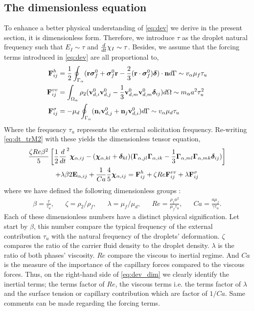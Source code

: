 \subsection{The dimensionless equation }


To enhance a better physical understanding of \ref{eq:dev} we derive in the present section, it is dimensionless form. 
Therefore, we introduce $\tau$ as the droplet natural frequency such that $E_I\sim \tau$ and $\frac{d}{dt} \chi_I \sim \tau$. 
Besides, we assume that the forcing terms introduced in \ref{eq:dev} are all proportional to, 
\begin{align*}
    \textbf{F}_{ij}^h
    &= \frac{1}{2}\oint_{\Gamma_{\alpha}} (\textbf{r}\bm\sigma_f^0 + \bm\sigma_f^0\textbf{r} - \frac{2}{3}(\textbf{r}\cdot \bm\sigma_f^0) \bm\delta)\cdot \textbf{n} d\Gamma 
    \sim v_\alpha \mu_f\tau_u \\
    \textbf{F}_{ij}^{vv}
    &= \int_{\Omega_{\alpha}} \rho_2 (\textbf{v}_{d,i}^0\textbf{v}_{d,j}^0 - \frac{1}{3}\textbf{v}_{d,m}^0\textbf{v}_{d,m}^0 \bm\delta_{ij})  d\Omega
    \sim  m_\alpha a^2\tau_u^2 \\
    \textbf{F}_{ij}^{\sigma}
    &= - \mu_d \oint_{\Gamma_{\alpha}} (\textbf{n}_i \textbf{v}_{d,j}^0 + \textbf{n}_j \textbf{v}_{d,i}^0) d\Gamma
    \sim  v_\alpha \mu_d\tau_u
\end{align*}
Where the frequency $\tau_u$ represents the external solicitation frequency. 
Re-writing \ref{eq:dt_trM2} with these yields the dimensionless tensor equation, 
\begin{multline}
    \frac{\zeta Re \beta^2}{5}
    \left[
        \frac{1}{2}\frac{d}{dt}^2 \bm\chi_{\alpha,ij}
        -   (\bm\chi_{\alpha,kl} + \bm\delta_{kl})
        (\bm\Gamma_{\alpha,jl}\bm\Gamma_{\alpha,ik}  
        - \frac{1}{3}
        \bm\Gamma_{\alpha,ml}\bm\Gamma_{\alpha,mk}  
        \bm\delta_{ij}
        )
    \right]\\
    + \lambda \beta 2 \textbf{E}_{\alpha,ij}
    + \frac{1}{Ca}
    \frac{4  }{5} \bm\chi_{\alpha,ij}
    = \textbf{F}_{ij}^h 
    + \zeta Re \textbf{F}_{ij}^{vv}
    + \lambda \textbf{F}_{ij}^{\sigma}
    \label{eq:dev_dim}
\end{multline}
where we have defined the following dimensionless groups : 
\begin{align*}
    \beta = \frac{\tau}{\tau_u},
    && \zeta = \rho_2 /\rho_f,
    && \lambda = \mu_f/\mu_d ,
    && Re = \frac{\rho_f a^2 }{ \mu_f \tau_u},
    && Ca = \frac{a \mu_f}{\gamma \tau_u}. 
\end{align*}
Each of these dimensionless numbers have a distinct physical signification. 
Let start by $\beta$, this number compare the typical frequency of the external contribution $\tau_u$ with the natural frequency of the droplets' deformation.
$\zeta$ compares the ratio of the carrier fluid density to the droplet density. 
$\lambda$ is the ratio of both phases' viscosity. 
$Re$ compare the viscous to inertial regime. 
And $Ca$ is the measure of the importance of the capillary forces compared to the viscous forces. 
Thus, on the right-hand side of \ref{eq:dev_dim} we clearly identify the inertial terms; the terms factor of $Re$, the viscous terms i.e. the terms factor of $\lambda$ and the surface tension or capillary contribution which are factor of $1/Ca$. 
Same comments can be made regarding the forcing terms. 

